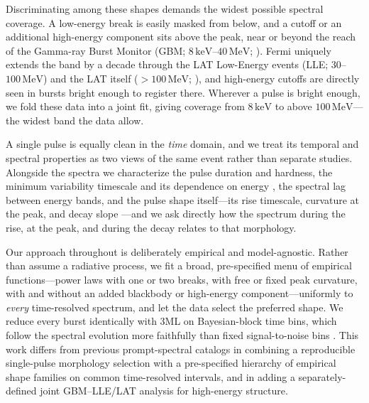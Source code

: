 Discriminating among these shapes demands the widest possible spectral coverage. A
low-energy break is easily masked from below, and a cutoff or an additional
high-energy component sits above the peak, near or beyond the reach of the Gamma-ray
Burst Monitor (GBM; $8\,\mathrm{keV}$--$40\,\mathrm{MeV}$; \citealt{Meegan2009}).
Fermi uniquely extends the band by a decade through the LAT Low-Energy events
(LLE; $30$--$100\,\mathrm{MeV}$) and the LAT itself
($>100\,\mathrm{MeV}$; \citealt{Atwood2009}), and high-energy cutoffs are directly
seen in bursts bright enough to register there. Wherever a pulse is bright enough,
we fold these data into a joint fit, giving coverage from $8\,\mathrm{keV}$ to above
$100\,\mathrm{MeV}$---the widest band the data allow.

A single pulse is equally clean in the \emph{time} domain, and we treat its temporal
and spectral properties as two views of the same event rather than separate studies.
Alongside the spectra we characterize the pulse duration and hardness, the minimum
variability timescale and its dependence on energy \citep{Golkhou2014,Golkhou2015},
the spectral lag between energy bands, and the pulse shape itself---its rise
timescale, curvature at the peak, and decay slope
\citep{Norris2005,Kocevski2003,Gowri2025}---and we ask directly how the spectrum
during the rise, at the peak, and during the decay relates to that morphology.

Our approach throughout is deliberately empirical and model-agnostic. Rather than
assume a radiative process, we fit a broad, pre-specified menu of empirical
functions---power laws with one or two breaks, with free or fixed peak curvature,
with and without an added blackbody or high-energy component---uniformly to
\emph{every} time-resolved spectrum, and let the data select the preferred shape. We
reduce every burst identically with \textsc{3ML} \citep{Vianello2015} on
Bayesian-block time bins, which follow the spectral evolution more faithfully than
fixed signal-to-noise bins \citep{Scargle2013}. This work differs from previous
prompt-spectral catalogs in combining a reproducible single-pulse morphology
selection \citep{Busby2024} with a pre-specified hierarchy of empirical shape
families on common time-resolved intervals, and in adding a separately-defined joint
GBM--LLE/LAT analysis for high-energy structure.

